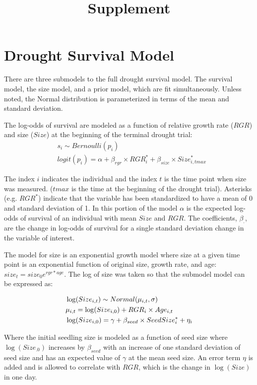 \documentclass{article}
\title{Supplement}
\date{}
\begin{document}
\maketitle
\listoffigures
\listoftables
\section{Drought Survival Model}


There are three submodels to the full drought survival model. The survival model, the size model, and a prior model, which are fit simultaneously. Unless noted, the Normal distribution is parameterized in terms of the mean and standard deviation.

The log-odds of survival are modeled as a function of relative growth rate (\(RGR\)) and size (\(Size\)) at the beginning of the terminal drought trial:
\begin{align*} 
&s_i \sim Bernoulli(p_i) \\
&logit(p_i) = \alpha + \beta_{rgr} \times RGR^*_i + \beta_{size} \times Size^*_{i,tmax}
\end{align*}

The index \(i\) indicates the individual and the index \(t\) is the time point when size was measured. (\(tmax\) is the time at the beginning of the drought trial). Asterisks (e.g. \(RGR^*\)) indicate that the variable has been standardized to have a mean of 0 and standard deviation of 1. In this portion of the model \(\alpha\) is the expected log-odds of survival of an individual with mean \(Size\) and \(RGR\). The coefficients, \(\beta_{.}\), are the change in log-odds of survival for a single standard deviation change in the variable of interest.

The model for size is an exponential growth model where size at a given time point is an exponential function of original size, growth rate, and age: \(size_t = size_0e^{rgr*age}\). The log of size was taken so that the submodel model can be expressed as:

\begin{align*}
&\log(Size_{i,t}) \sim Normal(\mu_{i,t},\space \sigma) \\
&\mu_{i,t} = \log(Size_{i,0}) + RGR_i \times Age_{i,t} \\
&\log(Size_{i,0}) = \gamma + \beta_{seed}\times SeedSize^*_i + \eta_i
\end{align*}

Where the initial seedling size is modeled as a function of seed size where \(\log(Size_.0)\) increases by \(\beta_{seed}\) with an increase of one standard deviation of seed size and has an expected value of \(\gamma\) at the mean seed size. An error term \(\eta\) is added and is allowed to correlate with \(RGR\), which is the change in \(\log(Size)\) in one day.
\end{document}
